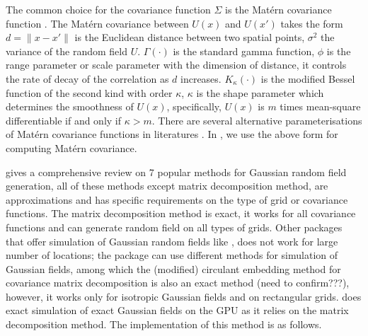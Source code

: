 \documentclass[article,nojss]{jss}\usepackage[]{graphicx}\usepackage[]{color}
\begin{document}
The common choice for the covariance function $\Sigma$ is the Mat\'ern covariance function \citep{matern1960spatial}. The Mat\'ern covariance between $U(x)$ and $U(x')$ takes the form 
$d =\|x-x'\|$ is the Euclidean distance between two spatial points, 
$\sigma^2$ the variance of the random field $U$.
$\Gamma(\cdot)$ is the standard gamma function,  $\phi$ is the range parameter or scale parameter with the dimension of distance, it controls the rate of decay of the correlation as $d$ increases. $K_\kappa(\cdot)$ is the modified Bessel function of the second kind with order $\kappa$, $\kappa$ is the shape parameter which determines the smoothness of $U(x)$, specifically, $U(x)$ is $m$ times mean-square differentiable if and only if $\kappa > m$. %
There are several alternative parameterisations of Mat\'ern covariance functions in literatures  \citep[see][]{haskard2007anisotropic}. In , we use the above form for computing Mat\'ern covariance.


\cite{LiuandLi2019} gives a comprehensive review on 7 popular methods for Gaussian random field generation, %
all of these methods except matrix decomposition method, are approximations and has specific requirements on the type of grid or covariance functions. The matrix decomposition method is exact, it works for all covariance functions and can generate random field on all types of grids. Other  packages that offer simulation of Gaussian random fields like  \citep{geoR2001}, does not work for large number of locations; the  \citep{RandomFields2015,RandomFields2020} package can use different methods for simulation of Gaussian fields, among which the (modified) circulant embedding method \citep{Dietrich1997FastAE} for covariance matrix decomposition is also an exact method (need to confirm???), however, it works only for isotropic Gaussian fields and on rectangular grids.  does exact simulation of exact Gaussian fields on the GPU as it relies on the matrix decomposition method. The implementation of this method is as follows.
\end{document}
